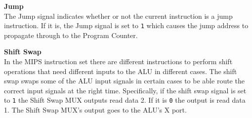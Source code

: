 \begin{description}
\item{\textbf{Jump}} \\
The Jump signal indicates whether or not the current instruction is a jump instruction.
If it is, the Jump signal is set to \texttt{1} which causes the jump address to propagate through to the Program Counter.

\item{\textbf{Shift Swap}} \\
In the MIPS instruction set there are different instructions to perform shift operations that need different inputs to the ALU in different cases.
The shift swap swaps some of the ALU input signals in certain cases to be able route the correct input signals at the right time.
Specifically, if the shift swap signal is set to \texttt{1} the Shift Swap MUX outputs read data 2.
If it is \texttt{0} the output is read data 1.
The Shift Swap MUX's output goes to the ALU's X port.

\end{description}
